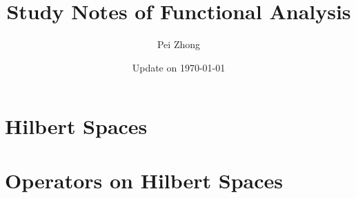 \documentclass[12pt,oneside]{book} %
\begin{document}
\title{\bf \huge Study Notes of Functional Analysis}
\author{Pei Zhong}
\date{Update on \today}

\maketitle


\tableofcontents

\begin{spacing}{1}









% 
\part{Hilbert Spaces}





% 

\part{Operators on Hilbert Spaces}













\end{spacing}
\end{document}
